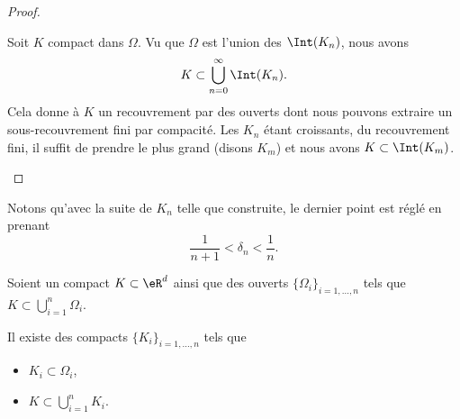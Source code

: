 \begin{proof}
\begin{enumerate}
		      Soit \( K\) compact dans \( \Omega\). Vu que \( \Omega\) est l'union des \( \Int(K_n)\), nous avons
		      \begin{equation}
			      K\subset\bigcup_{n=0}^{\infty}\Int(K_n).
		      \end{equation}
		      Cela donne à \( K\) un recouvrement par des ouverts dont nous pouvons extraire un sous-recouvrement fini par compacité. Les \( K_n\) étant croissants, du recouvrement fini, il suffit de prendre le plus grand (disons \( K_m\)) et nous avons \( K\subset\Int(K_m)\).
	\end{enumerate}
\end{proof}
Notons qu'avec la suite de \( K_n\) telle que construite, le dernier point est réglé en prenant
\begin{equation}
	\frac{1}{ n+1 }<\delta_n<\frac{1}{ n }.
\end{equation}


\begin{lemma}     \label{LEMooWRIXooSBHavt}
	Soient un compact \( K\subset \eR^d\) ainsi que des ouverts \( \{\Omega_i\}_{i=1,\ldots, n}\) tels que \( K\subset\bigcup_{i=1}^n\Omega_i\).

	Il existe des compacts \( \{ K_i \}_{i=1,\ldots, n}\) tels que
	\begin{itemize}
		\item
		      \( K_i\subset \Omega_i\),
		\item
		      \( K\subset\bigcup_{i=1}^nK_i\).
	\end{itemize}
\end{lemma}

